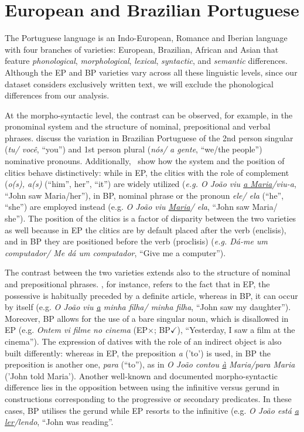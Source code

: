 \section{European and Brazilian Portuguese}
\label{app:pt_br_pt_pt}

The Portuguese language is an Indo-European, Romance and Iberian language with four branches of varieties: European, Brazilian, African and Asian that feature \textit{phonological}, \textit{morphological}, \textit{lexical}, \textit{syntactic}, and \textit{semantic} differences. Although the EP and BP varieties vary across all these linguistic levels, since our dataset considers exclusively written text, we will exclude the phonological differences from our analysis.

At the morpho-syntactic level, the contrast can be observed, for example, in the pronominal system and the structure of nominal, prepositional and verbal phrases. \citet{scherre2016main} discuss the variation in Brazilian Portuguese of the 2nd person singular (\textit{tu/ você}, ``you'') and 1st person plural (\textit{nós/ a gente}, ``we/the people'') nominative pronouns. Additionally,~\cite{kato2016european} show how the system and the position of clitics behave distinctively: while in EP, the clitics with the role of complement (\textit{o(s), a(s)} (``him'', her'', ``it'') are widely utilized (\textit{e.g. O João viu \underline{a Maria}/viu-a}, ``John saw Maria/her''), in BP, nominal phrase or the pronoun \textit{ele/ ela} (``he'', ``she'') are employed instead (e.g. \textit{O João viu \underline{Maria}/ ela}, ``John saw Maria/ she''). The position of the clitics is a factor of disparity between the two varieties as well because in EP the clitics are by default placed after the verb (enclisis), and in BP they are positioned before the verb (proclisis) (\textit{e.g. Dá-me um computador/ Me dá um computador}, ``Give me a computer'').

The contrast between the two varieties extends also to the structure of nominal and prepositional phrases. \citet{brit2016dp}, for instance, refers to the fact that in EP, the possessive is habitually preceded by a definite article, whereas in BP, it can occur by itself (e.g. \textit{O João viu \underline{a} minha filha/ minha filha}, ``John saw my daughter''). Moreover, BP allows for the use of a bare singular noun, which is disallowed in EP (e.g. \textit{Ontem vi filme no cinema} (EP$\times$; BP$\checkmark$), ``Yesterday, I saw a film at the cinema''). The expression of datives with the role of an indirect object is also built differently: whereas in EP, the preposition \textit{a} ('to') is used, in BP the preposition is another one, \textit{para} (``to''), as in \textit{O João contou \underline{à} Maria/para Maria} ('John told Maria'). Another well-known and documented morpho-syntactic difference lies in the opposition between using the infinitive versus gerund in constructions corresponding to the progressive or secondary predicates. In these cases, BP utilises the gerund while EP resorts to the infinitive (e.g. \textit{O João está \underline{a ler}/lendo}, ``John was reading''.

